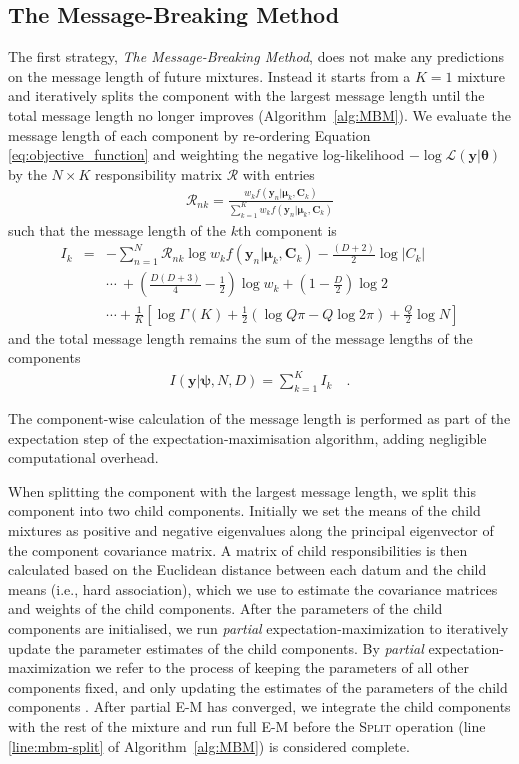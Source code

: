 \documentclass{elsarticle}
\newcommand{\vect}[1]{\boldsymbol{\mathbf{#1}}}
\renewcommand{\vec}[1]{\vect{#1}}
\def\cov{C}
\def\veccov{\vect{\cov}}
\def\vecmean{\vect{\mu}}
\def\vectheta{\vect{\theta}}
\def\weight{w}
\def\datum{y}
\def\data{\vect{\datum}}
\begin{document}
\subsection{The Message-Breaking Method} \label{sec:mbm}
The first strategy, \emph{The Message-Breaking Method}, does not make any predictions on
the message length of future mixtures. Instead it starts from 
a $K=1$ mixture and iteratively splits the component with the largest message length until 
the total message length no longer improves (Algorithm~\ref{alg:MBM}). We evaluate the message length of each component
by re-ordering Equation \ref{eq:objective_function} and weighting the negative log-likelihood
$-\log{\mathcal{L}}(\vec\data|\vectheta)$ by the $N \times K$ responsibility matrix $\mathcal{R}$ with entries
\begin{eqnarray}
	\mathcal{R}_{nk} = \frac{\weight_{k}f(\vec\data_n|\vecmean_k,\veccov_k)}{\sum_{k=1}^{K}\weight_{k}f(\vec\data_n|\vecmean_k,\veccov_k)}
\end{eqnarray}
\noindent{}such that the message length of the $k$th component is
\begin{eqnarray}
	I_k &=& -\sum_{n=1}^{N}\mathcal{R}_{nk}\log{\weight_{k}f(\data_{n}|\vecmean_k,\veccov_k)} -\frac{(D + 2)}{2}\log{|\cov_k|} \nonumber \\
		&& \cdots\ + \left(\frac{D(D+3)}{4}-\frac{1}{2}\right)\log{\weight_k} + \left(1 - \frac{D}{2}\right)\log{2} \nonumber \\
		&& \cdots + \frac{1}{K}\left[\log\Gamma(K) + \frac{1}{2}\left(\log{Q\pi} - Q\log{2\pi}\right) + \frac{Q}{2}\log{N}\right]
\end{eqnarray}
\noindent{}and the total message length remains the sum of the message lengths of the components
\begin{eqnarray}
	I(\vec\data|\vec\psi, N, D) = \sum_{k=1}^{K}I_{k} \quad .
\end{eqnarray}

The component-wise calculation of the message length is performed as part of the 
expectation step of the expectation-maximisation algorithm, adding negligible computational overhead.

When splitting the component with the largest message length, we split this component into two child components. Initially we 
set the means of the child mixtures as positive and negative eigenvalues along the principal
eigenvector of the component covariance matrix. A matrix of child responsibilities is then
calculated based on the Euclidean distance between each datum and the child means (i.e., hard
association), which we use to estimate the covariance matrices and weights of the child
components. After the parameters of the child components are initialised, we run \emph{partial}
expectation-maximization to iteratively update the parameter estimates of the child components. 
By \emph{partial} expectation-maximization we refer to the process of keeping the parameters of
all other components fixed, and only updating the estimates of the parameters of the child
components \citep{kasarapu2015minimum}. After partial E-M has converged, we integrate the child components with the rest of the mixture and run full E-M before the \textsc{Split} operation (line \ref{line:mbm-split} of Algorithm~\ref{alg:MBM}) is considered complete.
\end{document}

